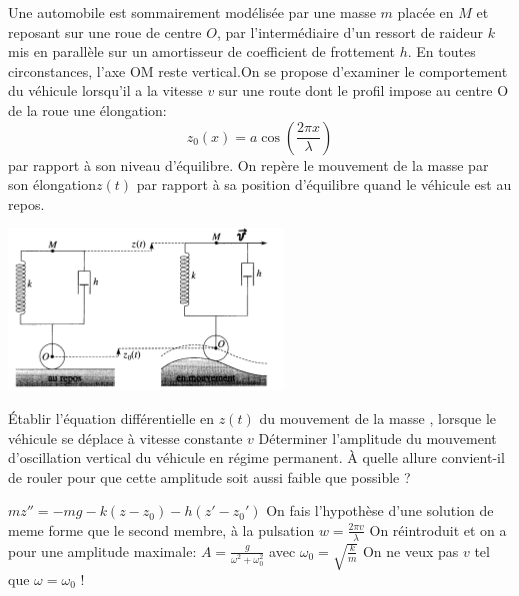 \begin{Exercise}[title=Suspension de voiture]
Une automobile est sommairement modélisée par une masse $m$ placée en $M$ et reposant sur une roue de centre $O$, par l’intermédiaire d’un ressort de raideur $k$ mis en parallèle sur un amortisseur de coefficient de frottement $h$.
En toutes circonstances, l’axe OM reste vertical.On se propose d’examiner le comportement du véhicule lorsqu’il a la vitesse $v$ sur une route dont le profil impose au centre O de la roue une élongation:
\[ z_0(x) = a\cos\left( \frac{2\pi x}{\lambda} \right) \]
par rapport à  son niveau d'équilibre.
On repère le mouvement de la masse par son élongation$ z(t)$ par rapport à sa position d’équilibre
quand le véhicule est au repos.
	\begin{center}
	\includegraphics[scale=0.8]{../fig/suspension.png}
	\end{center}
\Question Établir l’équation différentielle en $z(t)$ du mouvement de la masse , lorsque le véhicule se déplace à vitesse constante $v$
\Question Déterminer l’amplitude du mouvement d’oscillation vertical du véhicule en régime permanent.
\Question À quelle allure convient-il de rouler pour que cette amplitude soit aussi faible que possible ?
\end{Exercise}
\begin{Answer}
	\Question $mz'' = -mg -k(z-z_0)-h(z'-z_0')$
	\Question On fais l'hypothèse d'une solution de meme forme que le second membre, à la pulsation $w=\frac{2\pi v}{\lambda}$ On réintroduit et on a pour une amplitude maximale:
	$A =\frac{g}{\omega^2+\omega_0^2} $ avec $\omega_0 = \sqrt{\frac{k}{m}}$
	\Question On ne veux pas $v$ tel que $\omega = \omega_0$ !
\end{Answer}
